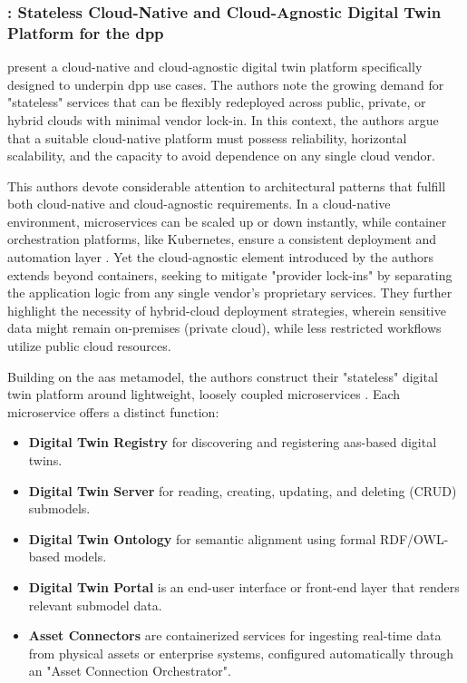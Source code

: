 \subsubsection*{\textcite{Redeker.2024}: Stateless Cloud-Native and Cloud-Agnostic Digital Twin Platform for the \ac{dpp}}
\textcite{Redeker.2024} present a cloud-native and cloud-agnostic digital twin platform specifically designed to underpin \ac{dpp} use cases. The authors note the growing demand for "stateless" services that can be flexibly redeployed across public, private, or hybrid clouds with minimal vendor lock-in. In this context, the authors argue that a suitable cloud-native platform must possess reliability, horizontal scalability, and the capacity to avoid dependence on any single cloud vendor. \autocite{Redeker.2024}

This authors devote considerable attention to architectural patterns that fulfill both cloud-native and cloud-agnostic requirements. In a cloud-native environment, microservices can be scaled up or down instantly, while container orchestration platforms, like Kubernetes, ensure a consistent deployment and automation layer \autocite{Dragoni.2017}. Yet the cloud-agnostic element introduced by the authors extends beyond containers, seeking to mitigate "provider lock-ins" by separating the application logic from any single vendor’s proprietary services. They further highlight the necessity of hybrid-cloud deployment strategies, wherein sensitive data might remain on-premises (private cloud), while less restricted workflows utilize public cloud resources. \autocite{Redeker.2024}

Building on the \ac{aas} metamodel, the authors construct their "stateless" digital twin platform around lightweight, loosely coupled microservices \autocite{Redeker.2024}. Each microservice offers a distinct function:

\begin{itemize}
    \item \textbf{Digital Twin Registry} for discovering and registering \ac{aas}-based digital twins.
    
    \item \textbf{Digital Twin Server} for reading, creating, updating, and deleting (CRUD) submodels.
    
    \item \textbf{Digital Twin Ontology} for semantic alignment using formal RDF/OWL-based models.
    
    \item \textbf{Digital Twin Portal} is an end-user interface or front-end layer that renders relevant submodel data.

    \item \textbf{Asset Connectors} are containerized services for ingesting real-time data from physical assets or enterprise systems, configured automatically through an "Asset Connection Orchestrator".
\end{itemize}

